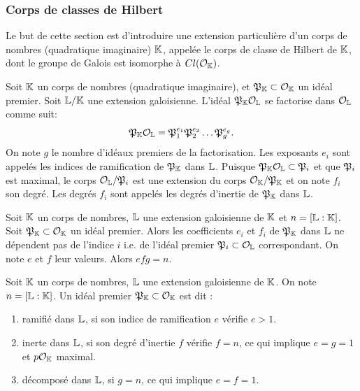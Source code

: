 \subsubsection{Corps de classes de Hilbert}

Le but de cette section est d'introduire une extension particulière d'un corps de nombres (quadratique imaginaire) $\mathbb{K}$, appelée le corps de classe de Hilbert de $\mathbb{K}$, dont le groupe de Galois est isomorphe à $Cl(\mathcal{O}_{\mathbb{K}})$.

\begin{Def}
	Soit $\mathbb{K}$ un corps de nombres (quadratique imaginaire), et $\mathfrak{P}_{\mathbb{K}}\subset\mathcal{O}_{\mathbb{K}}$ un idéal premier. Soit $\mathbb{L}/\mathbb{K}$ une extension galoisienne. L'idéal $\mathfrak{P}_{\mathbb{K}}\mathcal{O}_{\mathbb{L}}$ se factorise dans $\mathcal{O}_{\mathbb{L}}$ comme suit:
	\begin{equation*}
		\mathfrak{P}_{\mathbb{K}}\mathcal{O}_{\mathbb{L}} = \mathfrak{P}_{1}^{e_{1}}\mathfrak{P}_{2}^{e_{2}}\ldots\mathfrak{P}_{g}^{e_{g}}.
	\end{equation*} 
	On note $g$ le nombre d'idéaux premiers de la factorisation. Les exposants $e_{i}$ sont appelés les indices de ramification de $\mathfrak{P}_{\mathbb{K}}$ dans $\mathbb{L}$.
	Puisque $\mathfrak{P}_{\mathbb{K}}\mathcal{O}_{\mathbb{L}}\subset\mathfrak{P}_{i}$ et que $\mathfrak{P}_{i}$ est maximal, le corps $\mathcal{O}_{\mathbb{L}}/\mathfrak{P}_{i}$ est une extension du corps $\mathcal{O}_{\mathbb{K}}/\mathfrak{P}_{\mathbb{K}}$ et on note $f_{i}$ son degré. Les degrés $f_{i}$ sont appelés les degrés d'inertie de $\mathfrak{P}_{\mathbb{K}}$ dans $\mathbb{L}$.
\end{Def}


\begin{Prop}
	
	Soit $\mathbb{K}$ un corps de nombres, $\mathbb{L}$ une extension galoisienne de $\mathbb{K}$ et $n = \left[ \mathbb{L} : \mathbb{K}\right] $. Soit $\mathfrak{P}_{\mathbb{K}}\subset\mathcal{O}_{\mathbb{K}}$ un idéal premier. Alors les coefficients $e_{i}$ et $f_{i}$ de $\mathfrak{P}_{\mathbb{K}}$ dans $\mathbb{L}$ ne dépendent pas de l'indice $i$ i.e. de l'idéal premier $\mathfrak{P}_{i}\subset\mathcal{O}_{\mathbb{L}}$ correspondant.  
	On note $e$ et $f$ leur valeurs. Alors $efg = n$.
\end{Prop}

\begin{Def}
	Soit $\mathbb{K}$ un corps de nombres, $\mathbb{L}$ une extension galoisienne de $\mathbb{K}$. On note $n = \left[ \mathbb{L} : \mathbb{K}\right] $. Un idéal premier $\mathfrak{P}_{\mathbb{K}}\subset\mathcal{O}_{\mathbb{K}}$ est dit :
	\begin{enumerate}
		\item ramifié dans $\mathbb{L}$, si son indice de ramification $e$ vérifie $e > 1$.
		\item inerte dans $\mathbb{L}$, si son degré d'inertie $f$ vérifie $f = n$, ce qui implique $e = g = 1$ et $p\mathcal{O}_{\mathbb{K}}$ maximal.
		\item décomposé dans $\mathbb{L}$, si $g = n$, ce qui implique $e = f = 1$.
	\end{enumerate}
\end{Def}

